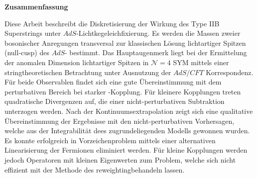 %
\begin{center}
{\sffamily \bfseries\Large Zusammenfassung}\\
\end{center}%
\vspace{1cm}
%
Diese Arbeit beschreibt die Diskretisierung der Wirkung des Type IIB  Superstrings unter $AdS$-Lichtkegeleichfixierung. Es werden die Massen zweier bosonischer Anregungen transversal zur klassischen Lösung lichtartiger Spitzen (null-cusp) des $AdS$- bestimmt. Das Hauptaugenmerk liegt bei der Ermittelung der anomalen Dimension lichtartiger Spitzen in $\mathcal{N}=4$ SYM mittels einer stringtheoretischen Betrachtung unter Ausnutzung der \linebreak $AdS/CFT$ Korrespondenz. Für beide Observablen findet sich eine gute Übereinstimmung mit dem perturbativen Bereich bei starker -Kopplung. Für kleinere Kopplungen treten quadratische Divergenzen auf, die einer nicht-perturbativen Subtraktion unterzogen werden. Nach der Kontinuumsextrapolation zeigt sich eine qualitative Übereinstimmung der Ergebnisse mit den nicht-perturbativen Vorhersagen, welche aus der Integrabilität dees zugrundeliegenden Modells gewonnen wurden. Es konnte erfolgreich in Vorzeichenproblem mittels einer alternativen Linearisierung der Fermionen eliminiert werden. Für kleine Kopplungen werden jedoch Operatoren mit kleinen Eigenwerten zum Problem, welche sich nicht effizient mit der Methode des \glqq reweighting\grqq{ }behandeln lassen.
